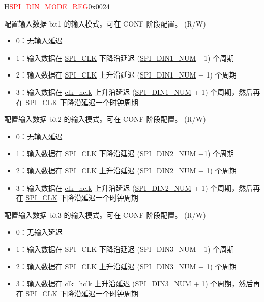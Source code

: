 \begin{register}{H}{\textcolor{red}{SPI\_DIN\_MODE\_REG}}{0x{}0024}
\begin{regdesc}
\begin{reglist}
\label{fielddesc:SPIDIN1MODE}\item [SPI\_DIN1\_MODE] 配置输入数据 bit1 的输入模式。可在 CONF 阶段配置。 (R/W)
\begin{itemize}
    \item 0：无输入延迟
    \item 1：输入数据在 \hyperref[clk:SPICLK]{SPI\_CLK} 下降沿延迟 (\hyperref[fielddesc:SPIDIN0NUM]{SPI\_DIN1\_NUM} +1) 个周期
    \item 2：输入数据在 \hyperref[clk:SPICLK]{SPI\_CLK} 上升沿延迟 (\hyperref[fielddesc:SPIDIN0NUM]{SPI\_DIN1\_NUM} + 1) 个周期
    \item 3：输入数据在 \hyperref[clk:clkhclk]{clk\_hclk} 上升沿延迟 (\hyperref[fielddesc:SPIDIN0NUM]{SPI\_DIN1\_NUM} + 1) 个周期，然后再在 \hyperref[clk:SPICLK]{SPI\_CLK} 下降沿延迟一个时钟周期
\end{itemize}
\label{fielddesc:SPIDIN2MODE}\item [SPI\_DIN2\_MODE] 配置输入数据 bit2 的输入模式。可在 CONF 阶段配置。 (R/W)
\begin{itemize}
    \item 0：无输入延迟
    \item 1：输入数据在 \hyperref[clk:SPICLK]{SPI\_CLK} 下降沿延迟 (\hyperref[fielddesc:SPIDIN0NUM]{SPI\_DIN2\_NUM} +1) 个周期
    \item 2：输入数据在 \hyperref[clk:SPICLK]{SPI\_CLK} 上升沿延迟 (\hyperref[fielddesc:SPIDIN0NUM]{SPI\_DIN2\_NUM} + 1) 个周期
    \item 3：输入数据在 \hyperref[clk:clkhclk]{clk\_hclk} 上升沿延迟 (\hyperref[fielddesc:SPIDIN0NUM]{SPI\_DIN2\_NUM} + 1) 个周期，然后再在 \hyperref[clk:SPICLK]{SPI\_CLK} 下降沿延迟一个时钟周期
\end{itemize}
\label{fielddesc:SPIDIN3MODE}\item [SPI\_DIN3\_MODE] 配置输入数据 bit3 的输入模式。可在 CONF 阶段配置。 (R/W)
\begin{itemize}
    \item 0：无输入延迟
    \item 1：输入数据在 \hyperref[clk:SPICLK]{SPI\_CLK} 下降沿延迟 (\hyperref[fielddesc:SPIDIN0NUM]{SPI\_DIN3\_NUM} +1) 个周期
    \item 2：输入数据在 \hyperref[clk:SPICLK]{SPI\_CLK} 上升沿延迟 (\hyperref[fielddesc:SPIDIN0NUM]{SPI\_DIN3\_NUM} + 1) 个周期
    \item 3：输入数据在 \hyperref[clk:clkhclk]{clk\_hclk} 上升沿延迟 (\hyperref[fielddesc:SPIDIN0NUM]{SPI\_DIN3\_NUM} + 1) 个周期，然后再在 \hyperref[clk:SPICLK]{SPI\_CLK} 下降沿延迟一个时钟周期
\end{itemize}

\item [见下页]
\end{reglist}\end{regdesc}
\end{register}

